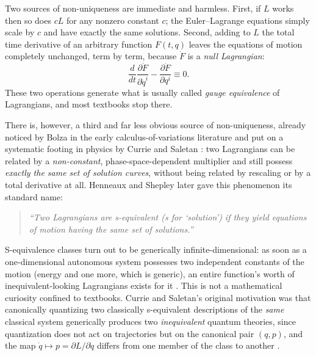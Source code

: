 \documentclass[11pt]{article}
\theoremstyle{remark}
\begin{document}
Two sources of non-uniqueness are immediate and harmless. First, if $L$ works then so does $cL$ for any nonzero constant $c$; the Euler--Lagrange equations simply scale by $c$ and have exactly the same solutions. Second, adding to $L$ the total time derivative of an arbitrary function $F(t,q)$ leaves the equations of motion completely unchanged, term by term, because $\dot F$ is a \emph{null Lagrangian}:
\begin{equation}
\frac{d}{dt}\frac{\partial \dot F}{\partial \dot q^i}-\frac{\partial \dot F}{\partial q^i}\equiv 0 .
\end{equation}
These two operations generate what is usually called \emph{gauge equivalence} of Lagrangians, and most textbooks stop there.

There is, however, a third and far less obvious source of non-uniqueness, already noticed by Bolza in the early calculus-of-variations literature \cite{Bolza1909} and put on a systematic footing in physics by Currie and Saletan \cite{CurrieSaletan1966}: two Lagrangians can be related by a \emph{non-constant}, phase-space-dependent multiplier and still possess \emph{exactly the same set of solution curves}, without being related by rescaling or by a total derivative at all. Henneaux and Shepley later gave this phenomenon its standard name:

\begin{quote}
\emph{``Two Lagrangians are s-equivalent (s for `solution') if they yield equations of motion having the same set of solutions.''} \cite{HenneauxShepley1982}
\end{quote}

S-equivalence classes turn out to be generically infinite-dimensional: as soon as a one-dimensional autonomous system possesses two independent constants of the motion (energy and one more, which is generic), an entire function's worth of inequivalent-looking Lagrangians exists for it \cite{Leubner1981}. This is not a mathematical curiosity confined to textbooks. Currie and Saletan's original motivation was that canonically quantizing two classically s-equivalent descriptions of the \emph{same} classical system generically produces two \emph{inequivalent} quantum theories, since quantization does not act on trajectories but on the canonical pair $(q,p)$, and the map $\dot q\mapsto p=\partial L/\partial \dot q$ differs from one member of the class to another \cite{CurrieSaletan1966,Henneaux1982}.
\end{document}
